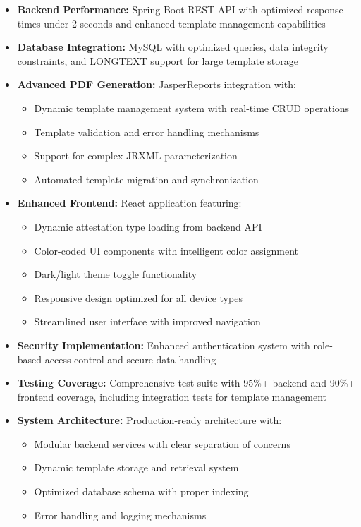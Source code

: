 \documentclass[a4paper,12pt]{report}
\begin{document}
\begin{doublespace}
\begin{itemize}
    \item \textbf{Backend Performance:} Spring Boot REST API with optimized response times under 2 seconds and enhanced template management capabilities
    \item \textbf{Database Integration:} MySQL with optimized queries, data integrity constraints, and LONGTEXT support for large template storage
    \item \textbf{Advanced PDF Generation:} JasperReports integration with:
    \begin{itemize}
        \item Dynamic template management system with real-time CRUD operations
        \item Template validation and error handling mechanisms
        \item Support for complex JRXML parameterization
        \item Automated template migration and synchronization
    \end{itemize}
    \item \textbf{Enhanced Frontend:} React application featuring:
    \begin{itemize}
        \item Dynamic attestation type loading from backend API
        \item Color-coded UI components with intelligent color assignment
        \item Dark/light theme toggle functionality
        \item Responsive design optimized for all device types
        \item Streamlined user interface with improved navigation
    \end{itemize}
    \item \textbf{Security Implementation:} Enhanced authentication system with role-based access control and secure data handling
    \item \textbf{Testing Coverage:} Comprehensive test suite with 95\%+ backend and 90\%+ frontend coverage, including integration tests for template management
    \item \textbf{System Architecture:} Production-ready architecture with:
    \begin{itemize}
        \item Modular backend services with clear separation of concerns
        \item Dynamic template storage and retrieval system
        \item Optimized database schema with proper indexing
        \item Error handling and logging mechanisms
    \end{itemize}
\end{itemize}

\end{doublespace}
\end{document}
